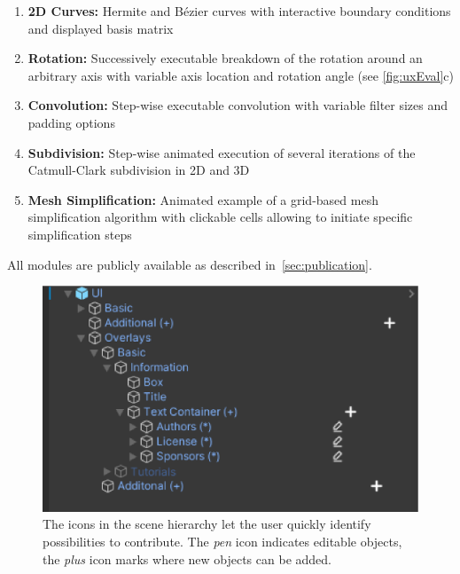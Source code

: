 \begin{enumerate}
	\vspace{-0.3cm}\item \textbf{2D Curves:} Hermite and B{\'e}zier curves with interactive boundary conditions and displayed basis matrix
	\vspace{-0.3cm}\item \textbf{Rotation:} Successively executable breakdown of the rotation around an arbitrary axis with variable axis location and rotation angle (see \autoref{fig:uxEval}c)
	\vspace{-0.3cm}\item \textbf{Convolution:} Step-wise executable convolution with variable filter sizes and padding options
	\vspace{-0.3cm}\item \textbf{Subdivision:} Step-wise animated execution of several iterations of the Catmull-Clark subdivision in 2D and 3D
	\vspace{-0.3cm}\item \textbf{Mesh Simplification:} Animated example of a grid-based mesh simplification algorithm with clickable cells allowing to initiate specific simplification steps
\end{enumerate}
All modules are publicly available as described in~\autoref{sec:publication}.
\begin{figure}[b!th]
	\centering
	\includegraphics[width=\linewidth]{pictures/userGuidance_Icons.png}
	\captionsetup{labelfont=bf,textfont=it}
	\caption{The icons in the scene hierarchy let the user quickly identify possibilities to contribute. The \emph{pen} icon indicates editable objects, the \emph{plus} icon marks where new objects can be added.\label{fig:userGuidance}}
\end{figure}


